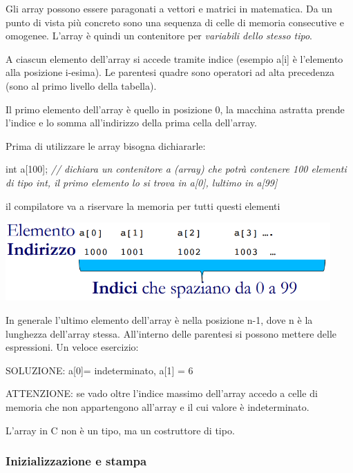 \documentclass[
  paper=a4,
  oneside  ,captions=tableheading
]{scrbook}
\newenvironment{Shaded}{}{}
\newcommand{\CommentTok}[1]{\textcolor[rgb]{0.38,0.63,0.69}{\textit{#1}}}
\newcommand{\DataTypeTok}[1]{\textcolor[rgb]{0.56,0.13,0.00}{#1}}
\newcommand{\DecValTok}[1]{\textcolor[rgb]{0.25,0.63,0.44}{#1}}
\newcommand{\NormalTok}[1]{#1}
\begin{document}
Gli array possono essere paragonati a vettori e matrici in matematica.
Da un punto di vista più concreto sono una sequenza di celle di memoria
consecutive e omogenee. L'array è quindi un contenitore per
\emph{variabili dello stesso tipo}.

A ciascun elemento dell'array si accede tramite indice (esempio a{[}i{]}
è l'elemento alla posizione i-esima). Le parentesi quadre sono operatori
ad alta precedenza (sono al primo livello della tabella).

Il primo elemento dell'array è quello in posizione 0, la macchina
astratta prende l'indice e lo somma all'indirizzo della prima cella
dell'array.

Prima di utilizzare le array bisogna dichiararle:

\begin{Shaded}
\begin{Highlighting}[]
\DataTypeTok{int}\NormalTok{ a[}\DecValTok{100}\NormalTok{]; }\CommentTok{// dichiara un contenitore a (array) che potrà contenere 100 elementi di tipo int, il primo elemento lo si trova in a[0], l\textquotesingle{}ultimo in a[99]}
\end{Highlighting}
\end{Shaded}

il compilatore va a riservare la memoria per tutti questi elementi

\includegraphics[height=3cm]{./image/image-20201208144533768-1607774562526.png}

In generale l'ultimo elemento dell'array è nella posizione n-1, dove n è
la lunghezza dell'array stessa. All'interno delle parentesi si possono
mettere delle espressioni. Un veloce esercizio:

SOLUZIONE: a{[}0{]}= indeterminato, a{[}1{]} = 6

ATTENZIONE: se vado oltre l'indice massimo dell'array accedo a celle di
memoria che non appartengono all'array e il cui valore è indeterminato.

L'array in C non è un tipo, ma un costruttore di tipo.

\hypertarget{inizializzazione-e-stampa}{%
\subsubsection{Inizializzazione e
stampa}\label{inizializzazione-e-stampa}}
\end{document}
